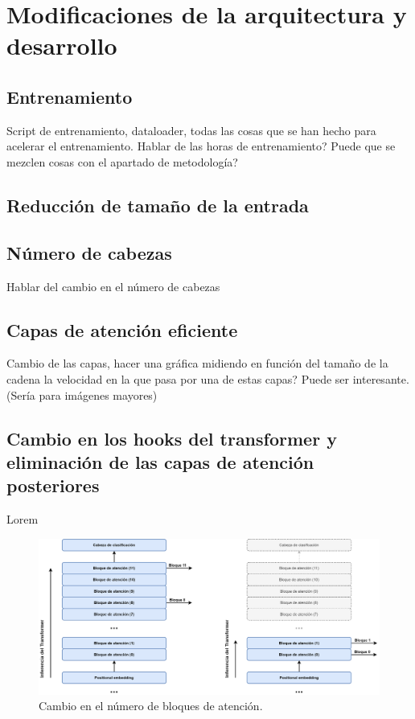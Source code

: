 \section{Modificaciones de la arquitectura y desarrollo}
\subsection{Entrenamiento}
Script de entrenamiento, dataloader, todas las cosas que se han hecho para acelerar el entrenamiento. Hablar de las horas de entrenamiento? Puede que se mezclen cosas con el apartado de metodología?
\subsection{Reducción de tamaño de la entrada}
\subsection{Número de cabezas}
Hablar del cambio en el número de cabezas
\subsection{Capas de atención eficiente}
Cambio de las capas, hacer una gráfica midiendo en función del tamaño de la cadena la velocidad en la que pasa por una de estas capas? Puede ser interesante. (Sería para imágenes mayores)
\subsection{Cambio en los hooks del transformer y eliminación de las capas de atención posteriores}
Lorem
\begin{figure}[H]
\centering
\includegraphics[width=\textwidth]{imagenes/DPT-cambio-bloques-transformer.png}
\caption{Cambio en el número de bloques de atención.}
\label{fig:attention_block_num}
\end{figure}

